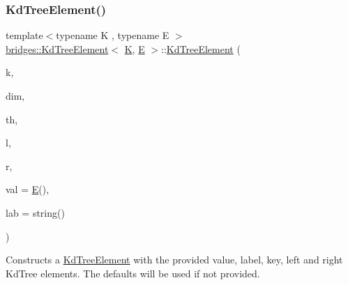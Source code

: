 \subsubsection{\texorpdfstring{KdTreeElement()}{KdTreeElement()}\hspace{0.1cm}{\footnotesize\ttfamily [1/2]}}
{\footnotesize\ttfamily template$<$typename K , typename E $>$ \\
\mbox{\hyperlink{classbridges_1_1_kd_tree_element}{bridges\+::\+Kd\+Tree\+Element}}$<$ \mbox{\hyperlink{namespacebridges_acfb0a4f7877d8f63de3e6862004c50edaa5f3c6a11b03839d46af9fb43c97c188}{K}}, \mbox{\hyperlink{namespacebridges_acfb0a4f7877d8f63de3e6862004c50eda3a3ea00cfc35332cedf6e5e9a32e94da}{E}} $>$\+::\mbox{\hyperlink{classbridges_1_1_kd_tree_element}{Kd\+Tree\+Element}} (\begin{DoxyParamCaption}\item[{const \mbox{\hyperlink{namespacebridges_acfb0a4f7877d8f63de3e6862004c50edaa5f3c6a11b03839d46af9fb43c97c188}{K}} \&}]{k,  }\item[{const int \&}]{dim,  }\item[{const int \&}]{th,  }\item[{const \mbox{\hyperlink{classbridges_1_1_kd_tree_element}{Kd\+Tree\+Element}}$<$ \mbox{\hyperlink{namespacebridges_acfb0a4f7877d8f63de3e6862004c50edaa5f3c6a11b03839d46af9fb43c97c188}{K}}, \mbox{\hyperlink{namespacebridges_acfb0a4f7877d8f63de3e6862004c50eda3a3ea00cfc35332cedf6e5e9a32e94da}{E}} $>$ $\ast$}]{l,  }\item[{\mbox{\hyperlink{classbridges_1_1_kd_tree_element}{Kd\+Tree\+Element}}$<$ \mbox{\hyperlink{namespacebridges_acfb0a4f7877d8f63de3e6862004c50edaa5f3c6a11b03839d46af9fb43c97c188}{K}}, \mbox{\hyperlink{namespacebridges_acfb0a4f7877d8f63de3e6862004c50eda3a3ea00cfc35332cedf6e5e9a32e94da}{E}} $>$ $\ast$}]{r,  }\item[{const \mbox{\hyperlink{namespacebridges_acfb0a4f7877d8f63de3e6862004c50eda3a3ea00cfc35332cedf6e5e9a32e94da}{E}} \&}]{val = {\ttfamily \mbox{\hyperlink{namespacebridges_acfb0a4f7877d8f63de3e6862004c50eda3a3ea00cfc35332cedf6e5e9a32e94da}{E}}()},  }\item[{const string \&}]{lab = {\ttfamily string()} }\end{DoxyParamCaption})\hspace{0.3cm}{\ttfamily [inline]}}

Constructs a \mbox{\hyperlink{classbridges_1_1_kd_tree_element}{Kd\+Tree\+Element}} with the provided value, label, key, left and right Kd\+Tree elements. The defaults will be used if not provided.


